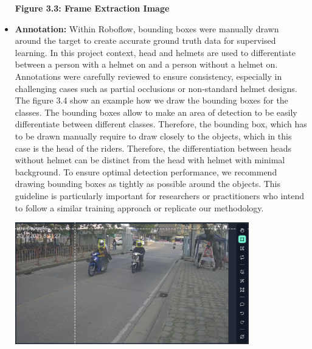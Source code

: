 \begin{itemize}
\begin{center}
		\vspace{0.5em}
		\textbf{Figure 3.3: Frame Extraction Image}
	\end{center}
	
	\item\textbf{Annotation:} Within Roboflow, bounding boxes were manually drawn around the target to create accurate ground truth data for supervised learning. In this project context, head and helmets are used to differentiate between a person with  a helmet on and a person without  a helmet on. Annotations were carefully reviewed to ensure consistency, especially in challenging cases such as partial occlusions or non-standard helmet designs. The figure 3.4 show an example how we draw the bounding boxes for the classes. The bounding boxes allow to make an area of detection to be easily differentiate between different classes. Therefore, the bounding box, which has to be drawn manually require to draw closely to the objects, which in this case is the head of the riders. Therefore, the differentiation between heads without helmet can be distinct from the head with helmet with minimal background. To ensure optimal detection performance, we recommend drawing bounding boxes as tightly as possible around the objects. This guideline is particularly important for researchers or practitioners who intend to follow a similar training approach or replicate our methodology.
	\begin{center}
		\includegraphics[width=0.8\textwidth]{Anotate.png}
		

\end{center}
\end{itemize}
